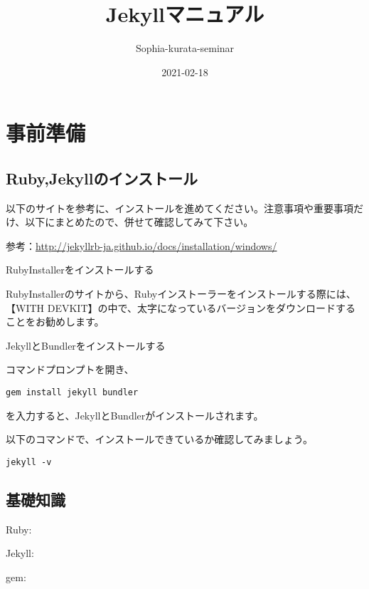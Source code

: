 \documentclass[
]{book}
\title{Jekyllマニュアル}
\author{Sophia-kurata-seminar}
\date{2021-02-18}
\begin{document}
\maketitle

{
\setcounter{tocdepth}{1}
\tableofcontents
}
\hypertarget{ux4e8bux524dux6e96ux5099}{%
\chapter*{事前準備}\label{ux4e8bux524dux6e96ux5099}}

\hypertarget{rubyjekyllux306eux30a4ux30f3ux30b9ux30c8ux30fcux30eb}{%
\section{Ruby,Jekyllのインストール}\label{rubyjekyllux306eux30a4ux30f3ux30b9ux30c8ux30fcux30eb}}

以下のサイトを参考に、インストールを進めてください。注意事項や重要事項だけ、以下にまとめたので、併せて確認してみて下さい。

参考：\url{http://jekyllrb-ja.github.io/docs/installation/windows/}

RubyInstallerをインストールする

RubyInstallerのサイトから、Rubyインストーラーをインストールする際には、【WITH DEVKIT】の中で、太字になっているバージョンをダウンロードすることをお勧めします。

JekyllとBundlerをインストールする

コマンドプロンプトを開き、

\begin{verbatim}
gem install jekyll bundler
\end{verbatim}

を入力すると、JekyllとBundlerがインストールされます。

以下のコマンドで、インストールできているか確認してみましょう。

\begin{verbatim}
jekyll -v
\end{verbatim}

\hypertarget{ux57faux790eux77e5ux8b58}{%
\section{基礎知識}\label{ux57faux790eux77e5ux8b58}}

Ruby:

Jekyll:

gem:
\end{document}
